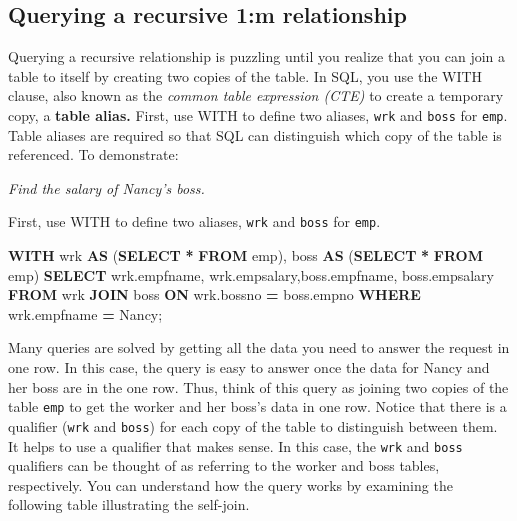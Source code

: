 \documentclass[
]{article}
\newenvironment{Shaded}{\begin{snugshade}}{\end{snugshade}}
\newcommand{\KeywordTok}[1]{\textcolor[rgb]{0.13,0.29,0.53}{\textbf{#1}}}
\newcommand{\NormalTok}[1]{#1}
\newcommand{\OperatorTok}[1]{\textcolor[rgb]{0.81,0.36,0.00}{\textbf{#1}}}
\newcommand{\StringTok}[1]{\textcolor[rgb]{0.31,0.60,0.02}{#1}}
\begin{document}
\hypertarget{querying-a-recursive-1m-relationship}{%
\subsection*{Querying a recursive 1:m relationship}\label{querying-a-recursive-1m-relationship}}

Querying a recursive relationship is puzzling until you realize that you
can join a table to itself by creating two copies of the table. In SQL,
you use the WITH clause, also known as the \emph{common table expression
(CTE)} to create a temporary copy, a \textbf{table alias.} First, use WITH to
define two aliases, \texttt{wrk} and \texttt{boss} for \texttt{emp}. Table aliases are
required so that SQL can distinguish which copy of the table is
referenced. To demonstrate:

\emph{Find the salary of Nancy's boss.}

First, use WITH to define two aliases, \texttt{wrk} and \texttt{boss} for \texttt{emp}.

\begin{Shaded}
\begin{Highlighting}[]
\KeywordTok{WITH}
\NormalTok{wrk }\KeywordTok{AS}\NormalTok{ (}\KeywordTok{SELECT} \OperatorTok{*} \KeywordTok{FROM}\NormalTok{ emp), }
\NormalTok{boss }\KeywordTok{AS}\NormalTok{ (}\KeywordTok{SELECT} \OperatorTok{*} \KeywordTok{FROM}\NormalTok{ emp) }
\KeywordTok{SELECT}\NormalTok{ wrk.empfname, wrk.empsalary,boss.empfname, boss.empsalary}
    \KeywordTok{FROM}\NormalTok{ wrk }\KeywordTok{JOIN}\NormalTok{ boss }
        \KeywordTok{ON}\NormalTok{ wrk.bossno }\OperatorTok{=}\NormalTok{ boss.empno}
        \KeywordTok{WHERE}\NormalTok{ wrk.empfname }\OperatorTok{=} \StringTok{\textquotesingle{}Nancy\textquotesingle{}}\NormalTok{;}
\end{Highlighting}
\end{Shaded}

Many queries are solved by getting all the data you need to answer the
request in one row. In this case, the query is easy to answer once the
data for Nancy and her boss are in the one row. Thus, think of this
query as joining two copies of the table \texttt{emp} to get the worker and her
boss's data in one row. Notice that there is a qualifier (\texttt{wrk} and
\texttt{boss}) for each copy of the table to distinguish between them. It helps
to use a qualifier that makes sense. In this case, the \texttt{wrk} and \texttt{boss}
qualifiers can be thought of as referring to the worker and boss tables,
respectively. You can understand how the query works by examining the
following table illustrating the self-join.
\end{document}
